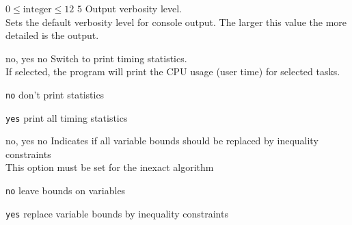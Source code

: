 %
{$0\leq\textrm{integer}\leq12$}%
{$5$}%
{Output verbosity level.\\
Sets the default verbosity level for console output. The larger this value the more detailed is the output.}%
{}

%
{\ttfamily no, yes}%
{no}%
{Switch to print timing statistics.\\
If selected, the program will print the CPU usage (user time) for selected tasks.}%
{\begin{list}{}{
\setlength{\parsep}{0em}
\setlength{\leftmargin}{5ex}
\setlength{\labelwidth}{2ex}
\setlength{\itemindent}{0ex}
\setlength{\topsep}{0pt}}
\item[\texttt{no}] don't print statistics
\item[\texttt{yes}] print all timing statistics
\end{list}
}

%
{\ttfamily no, yes}%
{no}%
{Indicates if all variable bounds should be replaced by inequality constraints\\
This option must be set for the inexact algorithm}%
{\begin{list}{}{
\setlength{\parsep}{0em}
\setlength{\leftmargin}{5ex}
\setlength{\labelwidth}{2ex}
\setlength{\itemindent}{0ex}
\setlength{\topsep}{0pt}}
\item[\texttt{no}] leave bounds on variables
\item[\texttt{yes}] replace variable bounds by inequality constraints
\end{list}
}

